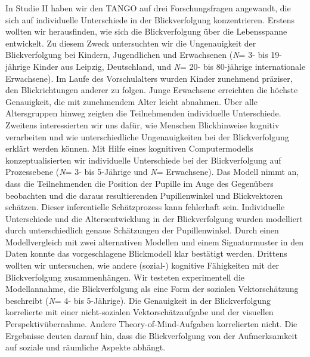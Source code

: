 \documentclass[
]{scrbook}
\begin{document}
In Studie II haben wir den TANGO auf drei Forschungsfragen angewandt, die sich auf individuelle Unterschiede in der Blickverfolgung konzentrieren. Erstens wollten wir herausfinden, wie sich die Blickverfolgung über die Lebensspanne entwickelt. Zu diesem Zweck untersuchten wir die Ungenauigkeit der Blickverfolgung bei Kindern, Jugendlichen und Erwachsenen (\emph{N}\thinspace = 3- bis 19-jährige Kinder aus Leipzig, Deutschland, und \emph{N}\thinspace = 20- bis 80-jährige internationale Erwachsene). Im Laufe des Vorschulalters wurden Kinder zunehmend präziser, den Blickrichtungen anderer zu folgen. Junge Erwachsene erreichten die höchste Genauigkeit, die mit zunehmendem Alter leicht abnahmen. Über alle Altersgruppen hinweg zeigten die Teilnehmenden individuelle Unterschiede. Zweitens interessierten wir uns dafür, wie Menschen Blickhinweise kognitiv verarbeiten und wie unterschiedliche Ungenauigkeiten bei der Blickverfolgung erklärt werden können. Mit Hilfe eines kognitiven Computermodells konzeptualisierten wir individuelle Unterschiede bei der Blickverfolgung auf Prozessebene (\emph{N}\thinspace = 3- bis 5-Jährige und \emph{N}\thinspace = Erwachsene). Das Modell nimmt an, dass die Teilnehmenden die Position der Pupille im Auge des Gegenübers beobachten und die daraus resultierenden Pupillenwinkel und Blickvektoren schätzen. Dieser inferentielle Schätzprozess kann fehlerhaft sein. Individuelle Unterschiede und die Altersentwicklung in der Blickverfolgung wurden modelliert durch unterschiedlich genaue Schätzungen der Pupillenwinkel. Durch einen Modellvergleich mit zwei alternativen Modellen und einem Signaturmuster in den Daten konnte das vorgeschlagene Blickmodell klar bestätigt werden. Drittens wollten wir untersuchen, wie andere (sozial-) kognitive Fähigkeiten mit der Blickverfolgung zusammenhängen. Wir testeten experimentell die Modellannahme, die Blickverfolgung als eine Form der sozialen Vektorschätzung beschreibt (\emph{N}\thinspace = 4- bis 5-Jährige). Die Genauigkeit in der Blickverfolgung korrelierte mit einer nicht-sozialen Vektorschätzaufgabe und der visuellen Perspektivübernahme. Andere Theory-of-Mind-Aufgaben korrelierten nicht. Die Ergebnisse deuten darauf hin, dass die Blickverfolgung von der Aufmerksamkeit auf soziale und räumliche Aspekte abhängt.
\end{document}
